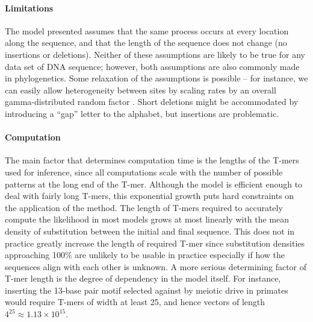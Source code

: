 \documentclass{article}
\theoremstyle{plain}
\theoremstyle{definition}
\begin{document}
\paragraph{Limitations}
The model presented assumes that the same process occurs at every location along the sequence,
and that the length of the sequence does not change (no insertions or deletions).
Neither of these assumptions are likely to be true for any data set of DNA sequence;
however, both assumptions are also commonly made in phylogenetics.
Some relaxation of the assumptions is possible -- for instance,
we can easily allow heterogeneity between sites by scaling rates by an overall gamma-distributed random factor \citep{yang1994maximum}.
Short deletions might be accommodated by introducing a ``gap'' letter to the alphabet,
but insertions are problematic.



\paragraph{Computation}
The main factor that determines computation time
is the lengths of the T-mers used for inference,
since all computations scale with the number of possible patterns at the long end of the T-mer.
Although the model is efficient enough to deal with fairly long T-mers,
this exponential growth puts hard constraints on the application of the method.
The length of T-mers required to accurately compute the likelihood in most models grows at most linearly
with the mean density of substitution between the initial and final sequence.
This does not in practice greatly increase the length of required T-mer
since substitution densities approaching 100\% are unlikely to be usable in practice
especially if how the sequences align with each other is unknown.
A more serious determining factor of T-mer length is the degree of dependency in the model itself.
For instance, inserting the 13-base pair motif selected against by meiotic drive in primates \citep{myers2010drive}
would require T-mers of width at least 25, and hence vectors of length $4^{25} \approx 1.13 \times 10^{15}$.
\end{document}
